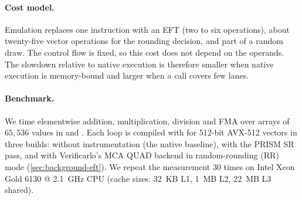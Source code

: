 \paragraph{Cost model.}
\label{sec:prism-cost}
Emulation replaces one instruction with an EFT (two to six operations), about
twenty-five vector operations for the rounding decision, and part of a random
draw. The control flow is fixed, so this cost does not depend on the operands.
The slowdown relative to native execution is therefore smaller when native
execution is memory-bound and larger when a call covers few lanes.

\paragraph{Benchmark.}
We time elementwise addition, multiplication, division and FMA over arrays of
$65{,}536$ values in  and . Each loop is compiled
with  for 512-bit AVX-512 vectors in three builds: without
instrumentation (the native baseline), with the PRISM SR pass, and with
Verificarlo's MCA QUAD backend in random-rounding (RR) mode
(\cref{sec:background-eft}). We repeat the measurement $30$ times on Intel Xeon
Gold 6130 @ 2.1~GHz CPU (cache sizes: 32~KB L1, 1~MB L2, 22~MB L3 shared).

